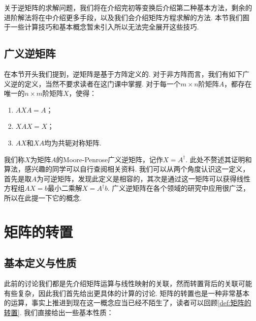 关于逆矩阵的求解问题，我们将在介绍完初等变换后介绍第二种基本方法，剩余的进阶解法将在中介绍更多手段，以及我们会介绍矩阵方程求解的方法. 本节我们囿于一些计算技巧和基本概念暂未引入所以无法完全展开这些技巧.

\subsection{广义逆矩阵}

在本节开头我们提到，逆矩阵是基于方阵定义的. 对于非方阵而言，我们有如下广义逆的定义，当然不要求读者在这门课中掌握. 对于每一个$m \times n$阶矩阵$A$，都存在唯一的$n \times m$阶矩阵$X$，使得：
\begin{enumerate}
    \item $AXA=A$；

    \item $XAX=X$；

    \item $AX$和$XA$均为共轭对称矩阵.
\end{enumerate}
我们称$X$为矩阵$A$的Moore-Penrose广义逆矩阵，记作$X=A^\dagger$. 此处不赘述其证明和算法，感兴趣的同学可以自行查阅相关资料. 我们可以从两个角度认识这一定义，首先是取$A$为可逆矩阵，发现此定义是相容的，其次是通过这一矩阵可以获得线性方程组$AX=b$最小二乘解$X=A^\dagger b$. 广义逆矩阵在各个领域的研究中应用很广泛，所以在此提一下它的概念.

\section{矩阵的转置}
\subsection{基本定义与性质}

此前的讨论我们都是先介绍矩阵运算与线性映射的关联，然而转置背后的关联可能有些复杂，因此我们首先给出更具体的计算的讨论. 矩阵的转置也是一种非常基本的运算，事实上推进到现在这一概念应当已经不陌生了，读者可以回顾\autoref{def:矩阵的转置}. 我们直接给出一些基本性质：

